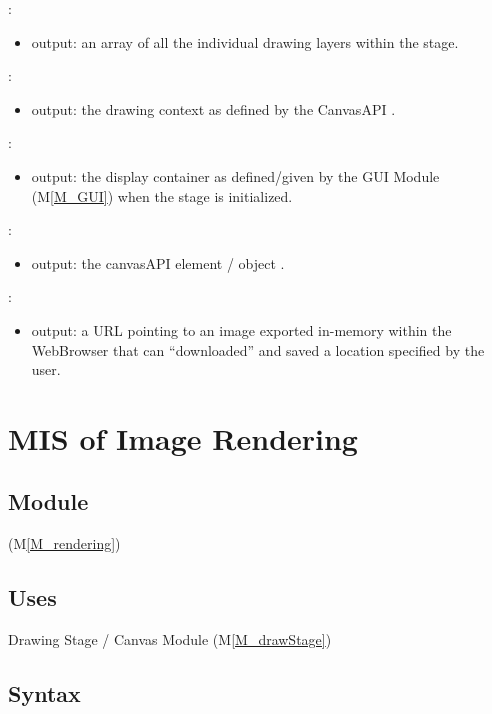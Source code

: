 \documentclass[12pt, titlepage]{article}
\newcommand{\mref}[1]{M\ref{#1}}
\newcommand{\mrefp}[1]{(\mref{#1})}
\newcommand{\mreff}[1]{Module \mrefp{#1}}
\begin{document}
\noindent {}:
\begin{itemize}
\item output: an array of all the individual drawing layers within the stage.
\end{itemize}

\noindent {}:
\begin{itemize}
\item output: the drawing context as defined by the CanvasAPI \cite{html_std_canvas}.
\end{itemize}

\noindent {}:
\begin{itemize}
\item output: the display container as defined/given by the GUI \mreff{M_GUI} when the stage is initialized.
\end{itemize}

\noindent {}:
\begin{itemize}
\item output: the canvasAPI element / object \cite{html_std_canvas}.
\end{itemize}

\noindent {}:
\begin{itemize}
\item output: a URL pointing to an image exported in-memory within the WebBrowser that can
  ``downloaded'' and saved a location specified by the user.
\end{itemize}

\newpage



\section{MIS of Image Rendering} \label{MS_rendering}

\subsection{Module}
 \mrefp{M_rendering}

\subsection{Uses}
Drawing Stage / Canvas \mreff{M_drawStage}

\subsection{Syntax}
\end{document}
